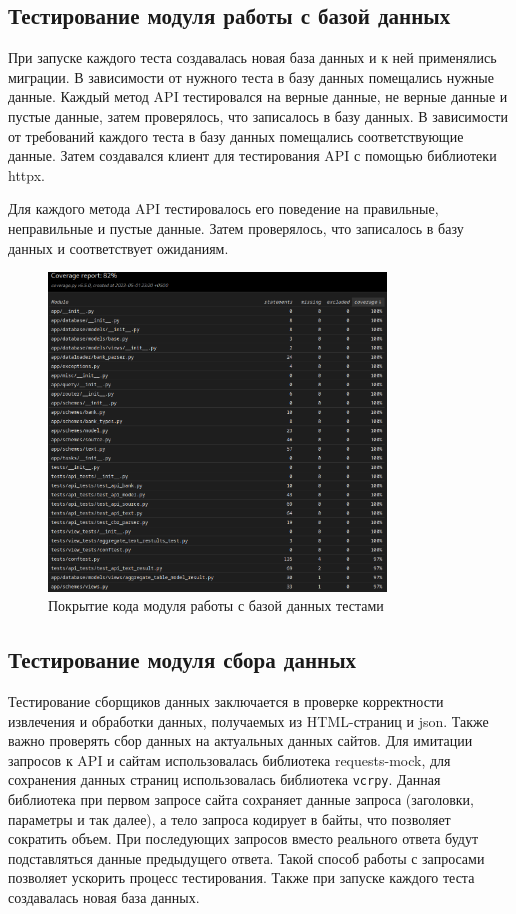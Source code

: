 \documentclass[PI, VKR]{HSEUniversity}
\begin{document}
\subsection{Тестирование модуля работы с базой данных}
\label{sec:orgf83cc3b}
При запуске каждого теста создавалась новая база данных и к ней применялись миграции. В зависимости от нужного теста в базу данных помещались нужные данные. Каждый метод API тестировался на верные данные, не верные данные и пустые данные, затем проверялось, что записалось в базу данных. В зависимости от требований каждого теста в базу данных помещались соответствующие данные. Затем создавался клиент для тестирования API с помощью библиотеки httpx.

Для каждого метода API тестировалось его поведение на правильные, неправильные и пустые данные. Затем проверялось, что записалось в базу данных и соответствует ожиданиям.

\begin{figure}[h]
\centering
\includegraphics[width=0.8\textwidth]{img/api_coverage.png}
\caption{\label{fig:api_coverage}Покрытие кода модуля работы с базой данных тестами}
\end{figure}
\subsection{Тестирование модуля сбора данных}
\label{sec:orgfc86b07}
Тестирование сборщиков данных заключается в проверке корректности извлечения и обработки данных, получаемых из HTML-страниц и json. Также важно проверять сбор данных на актуальных данных сайтов. Для имитации запросов к API и сайтам использовалась библиотека requests-mock, для сохранения данных страниц использовалась библиотека \texttt{vcrpy}. Данная библиотека при первом запросе сайта сохраняет данные запроса (заголовки, параметры и так далее), а тело запроса кодирует в байты, что позволяет сократить объем. При последующих запросов вместо реального ответа будут подставляться данные предыдущего ответа. Такой способ работы с запросами позволяет ускорить процесс тестирования. Также при запуске каждого теста создавалась новая база данных.
\end{document}
